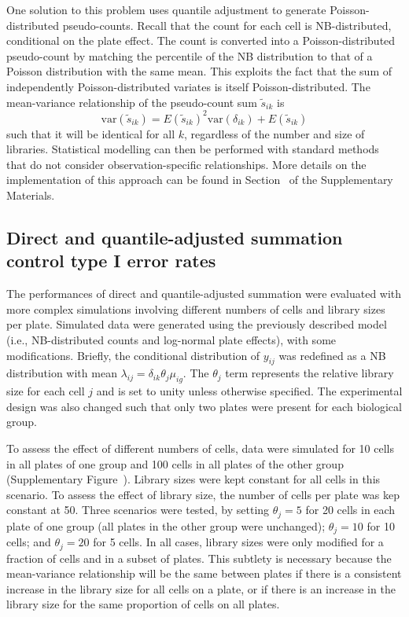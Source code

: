 \documentclass[oupdraft]{bio}
\begin{document}
One solution to this problem uses quantile adjustment \citep{robinson2008small} to generate Poisson-distributed pseudo-counts.
Recall that the count for each cell is NB-distributed, conditional on the plate effect.
The count is converted into a Poisson-distributed pseudo-count by matching the percentile of the NB distribution to that of a Poisson distribution with the same mean.
This exploits the fact that the sum of independently Poisson-distributed variates is itself Poisson-distributed.
The mean-variance relationship of the pseudo-count sum $\tilde{s}_{ik}$ is
\[
    \mbox{var}(\tilde{s}_{ik}) = E(\tilde{s}_{ik})^2 \mbox{var}(\delta_{ik}) + E(\tilde{s}_{ik}) 
\]
such that it will be identical for all $k$, regardless of the number and size of libraries.
Statistical modelling can then be performed with standard methods that do not consider observation-specific relationships.
More details on the implementation of this approach can be found in Section~\suppquantile{} of the Supplementary Materials.

\subsection{Direct and quantile-adjusted summation control type I error rates}
The performances of direct and quantile-adjusted summation were evaluated with more complex simulations involving different numbers of cells and library sizes per plate.
Simulated data were generated using the previously described model (i.e., NB-distributed counts and log-normal plate effects), with some modifications.
Briefly, the conditional distribution of $y_{ij}$ was redefined as a NB distribution with mean $\lambda_{ij} = \delta_{ik}\theta_{j}\mu_{ig}$.
The $\theta_{j}$ term represents the relative library size for each cell $j$ and is set to unity unless otherwise specified.
The experimental design was also changed such that only two plates were present for each biological group.

To assess the effect of different numbers of cells, data were simulated for 10 cells in all plates of one group and 100 cells in all plates of the other group (Supplementary Figure~\suppcompsim{}).
Library sizes were kept constant for all cells in this scenario.
To assess the effect of library size, the number of cells per plate was kep constant at 50.
Three scenarios were tested, by setting $\theta_j=5$ for 20 cells in each plate of one group (all plates in the other group were unchanged);
    $\theta_j=10$ for 10 cells; and $\theta_j=20$ for 5 cells.
In all cases, library sizes were only modified for a fraction of cells and in a subset of plates.
This subtlety is necessary because the mean-variance relationship will be the same between plates if there is a consistent increase in the library size for all cells on a plate, 
    or if there is an increase in the library size for the same proportion of cells on all plates.
\end{document}
